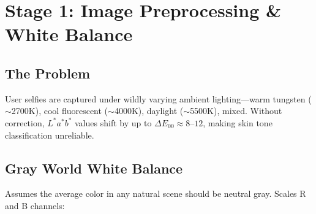 \documentclass[12pt,a4paper]{article}
\begin{document}
\begin{center}
\end{center}

\section{Stage 1: Image Preprocessing \& White Balance}

\subsection{The Problem}
User selfies are captured under wildly varying ambient lighting---warm tungsten ($\sim$2700K), cool fluorescent ($\sim$4000K), daylight ($\sim$5500K), mixed. Without correction, $L^*a^*b^*$ values shift by up to $\Delta E_{00} \approx 8$--$12$, making skin tone classification unreliable.

\subsection{Gray World White Balance}
Assumes the average color in any natural scene should be neutral gray. Scales R and B channels:
\end{document}
